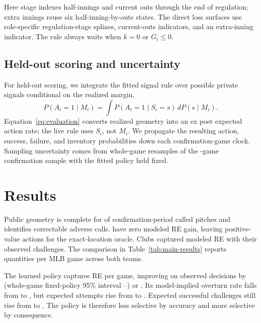 \documentclass[12pt,letterpaper]{article}
\begin{document}
Here stage indexes half-innings and current outs through the end of regulation;
extra innings reuse six half-inning-by-outs states. The direct loss surfaces
use role-specific regulation-stage splines, current-outs indicators, and an
extra-inning indicator. The rule always waits when $k=0$ or $G_i\le0$.

\subsection{Held-out scoring and uncertainty}

For held-out scoring, we integrate the fitted signal rule over possible private
signals conditional on the realized margin,
\begin{equation}
  P(A_i=1\mid M_i)=\int P(A_i=1\mid S_i=s)\,dP(s\mid M_i).
  \label{eq:evaluation}
\end{equation}
Equation~\eqref{eq:evaluation} converts realized geometry into an ex post
expected action rate; the live rule uses $S_i$, not $M_i$. We propagate the
resulting action, success, failure, and inventory probabilities down each
confirmation-game clock. Sampling uncertainty comes from
\ConditionalBootstrapReplicates{} whole-game resamples of the
\ConfirmationGames{}-game confirmation sample with the fitted policy held
fixed.

\FloatBarrier
\section{Results}

Public geometry is complete for \ConfirmationTrackedPitches{} of
\ConfirmationCalledPitches{} confirmation-period called pitches and identifies
\GeometryCorrectableCalls{} correctable adverse calls. \ZeroValueCorrectableCalls{} have zero
modeled RE gain, leaving \PositiveValueOracleActions{} positive-value actions for the exact-location
oracle. Clubs captured \ObservedCapturedRETotal{} modeled RE with their
\ConfirmationChallenges{} observed
challenges. The comparison in Table~\ref{tab:main-results} reports quantities
per MLB game across both teams.



The learned policy captures \LearnedREPerGame{} RE per game, improving on
observed decisions by \GainREPerGame{} (whole-game fixed-policy 95\% interval
\GainLowerPerGame{}--\GainUpperPerGame{}) or \RelativeGainPercent{}. Its
model-implied overturn rate falls from \ObservedSuccessRate{} to
\LearnedSuccessRate{}, but expected attempts rise from \ObservedAttempts{} to
\LearnedAttempts{}. Expected successful challenges still rise from
\ConfirmationOverturned{} to \LearnedExpectedSuccesses{}. The policy is therefore less selective by accuracy and more selective
by consequence.
\end{document}
